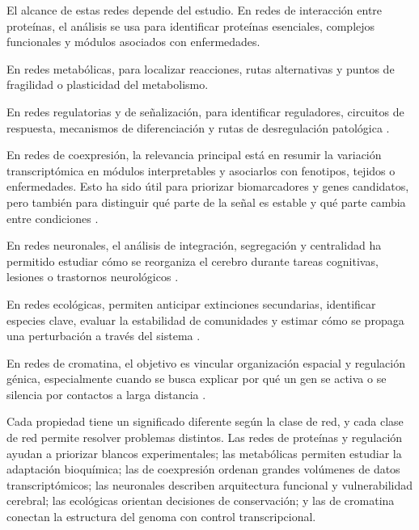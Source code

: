 \documentclass[11pt]{article}
\begin{document}

El alcance de estas redes depende del estudio. En redes de interacción entre proteínas, el análisis se usa para identificar proteínas esenciales, complejos funcionales y módulos asociados con enfermedades.

En redes metabólicas, para localizar reacciones, rutas alternativas y puntos de fragilidad o plasticidad del metabolismo. 

En redes regulatorias y de señalización, para identificar reguladores, circuitos de respuesta, mecanismos de diferenciación y rutas de desregulación patológica \parencite{BanfRhee2017,EmmertStreib2014,Jeong2001}.

En redes de coexpresión, la relevancia principal está en resumir la variación transcriptómica en módulos interpretables y asociarlos con fenotipos, tejidos o enfermedades. Esto ha sido útil para priorizar biomarcadores y genes candidatos, pero también para distinguir qué parte de la señal es estable y qué parte cambia entre condiciones \parencite{Gnanakkumaar2019,Zheng2021,ZhangHorvath2005}.

En redes neuronales, el análisis de integración, segregación y centralidad ha permitido estudiar cómo se reorganiza el cerebro durante tareas cognitivas, lesiones o trastornos neurológicos \parencite{BullmoreSporns2009}. 

En redes ecológicas, permiten anticipar extinciones secundarias, identificar especies clave, evaluar la estabilidad de comunidades y estimar cómo se propaga una perturbación a través del sistema \parencite{Bascompte2009,Dunne2002,Memmott2004}. 

En redes de cromatina, el objetivo es vincular organización espacial y regulación génica, especialmente cuando se busca explicar por qué un gen se activa o se silencia por contactos a larga distancia \parencite{Beagrie2017}.

Cada propiedad tiene un significado diferente según la clase de red, y cada clase de red permite resolver problemas distintos. Las redes de proteínas y regulación ayudan a priorizar blancos experimentales; las metabólicas permiten estudiar la adaptación bioquímica; las de coexpresión ordenan grandes volúmenes de datos transcriptómicos; las neuronales describen arquitectura funcional y vulnerabilidad cerebral; las ecológicas orientan decisiones de conservación; y las de cromatina conectan la estructura del genoma con control transcripcional. 
\end{document}
